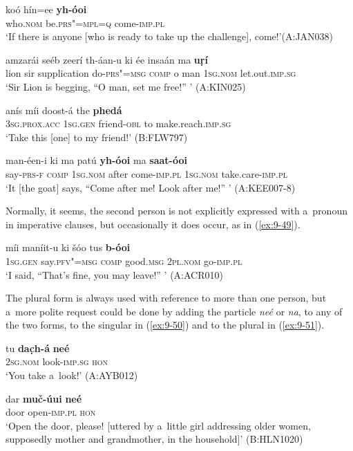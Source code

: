 \begin{exe}
\ex
\label{ex:9-45}
\gll koó hín=ee \textbf{yh-óoi}\\
who.\textsc{nom} be.\textsc{prs"=mpl=q} come-\textsc{imp.pl}\\
\glt `If there is anyone [who is ready to take up the challenge], come!'\newline (A:JAN038)

\ex
\label{ex:9-46}
\gll amzarái seéb zeerí th-áan-u ki ée insaán ma \textbf{uṛí}\\
lion sir supplication do-\textsc{prs"=msg} \textsc{comp} o man \textsc{1sg.nom} let.out.\textsc{imp.sg}\\
\glt `Sir Lion is begging, ``O man, set me free!'' ' (A:KIN025)

\ex
\label{ex:9-47}
\gll anís míi doost-á the \textbf{phedá} \\
\textsc{3sg.prox.acc} \textsc{1sg.gen} friend-\textsc{obl} to make.reach.\textsc{imp.sg}\\
\glt `Take this [one] to my friend!' (B:FLW797)

\ex
\label{ex:9-48}
\gll man-éen-i ki ma patú \textbf{yh-óoi} ma \textbf{saat-óoi} \\
say-\textsc{prs-f} \textsc{comp} \textsc{1sg.nom} after come-\textsc{imp.pl} \textsc{1sg.nom} take.care-\textsc{imp.pl} \\
\glt `It [the goat] says, ``Come after me! Look after me!'' ' (A:KEE007-8)
\end{exe}

Normally, it seems, the second person is not explicitly expressed with a~pronoun in imperative clauses, but occasionally it does occur, as in (\ref{ex:9-49}).

\begin{exe}
\ex
\label{ex:9-49}
\gll míi maníit-u ki šóo tus \textbf{b-óoi} \\
\textsc{1sg.gen} say.\textsc{pfv"=msg} \textsc{comp} good.\textsc{msg} \textsc{2pl.nom} go-\textsc{imp.pl} \\
\glt `I said, ``That's fine, you may leave!'' ' (A:ACR010)
\end{exe}

The plural form is always used with reference to more than one person, but a~more polite request could be done by adding the particle \textit{neé} or \textit{na}, to any of the two forms, to the singular in (\ref{ex:9-50}) and to the plural in (\ref{ex:9-51}).

\begin{exe}
\ex
\label{ex:9-50}
\gll tu \textbf{dac̣h-á} \textbf{neé} \\
\textsc{2sg.nom} look-\textsc{imp.sg} \textsc{hon}  \\
\glt `You take a~look!' (A:AYB012)

\ex
\label{ex:9-51}
\gll dar \textbf{muč-úui} \textbf{neé} \\
door open-\textsc{imp.pl} \textsc{hon} \\
\glt `Open the door, please! [uttered by a~little girl addressing older women, supposedly mother and grandmother, in the household]' (B:HLN1020)
\end{exe}


